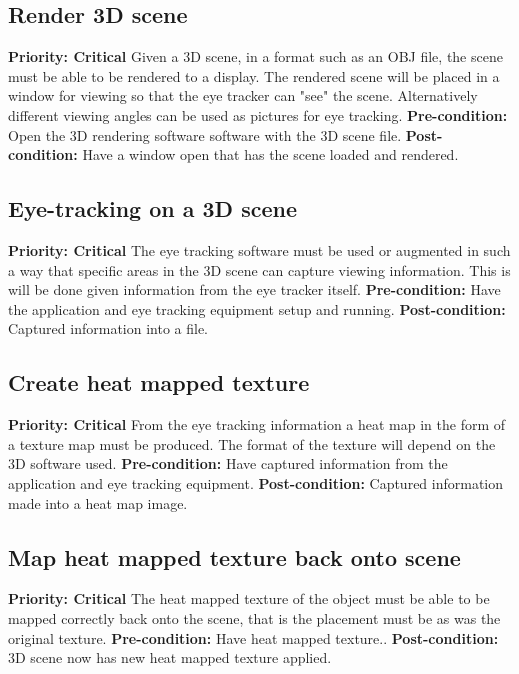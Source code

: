 
\subsection{Render 3D scene}
    \textbf{Priority: Critical}\newline
    Given a 3D scene, in a format such as an OBJ file, the scene must be able to be rendered to a display. The rendered scene will be placed in a window for viewing so that the eye tracker can "see" the scene. Alternatively different viewing angles can be used as pictures for eye tracking.\newline
    \textbf{Pre-condition: }
    Open the 3D rendering software software with the 3D scene file.\newline
    \textbf{Post-condition: }
    Have a window open that has the scene loaded and rendered.
    
\subsection{Eye-tracking on a 3D scene}
    \textbf{Priority: Critical}\newline
    The eye tracking software must be used or augmented in such a way that specific areas in the 3D scene can capture viewing information. This is will be done given information from the eye tracker itself.\newline
    \textbf{Pre-condition: }
    Have the application and eye tracking equipment setup and running.\newline
    \textbf{Post-condition: }
    Captured information into a file.
    
\subsection{Create heat mapped texture}
    \textbf{Priority: Critical}\newline
    From the eye tracking information a heat map in the form of a texture map must be produced. The format of the texture will depend on the 3D software used.\newline
    \textbf{Pre-condition: }
    Have captured information from the application and eye tracking equipment.\newline
    \textbf{Post-condition: }
    Captured information made into a heat map image.
    
\subsection{Map heat mapped texture back onto scene}
    \textbf{Priority: Critical}\newline
    The heat mapped texture of the object must be able to be mapped correctly back onto the scene, that is the placement must be as was the original texture.\newline
    \textbf{Pre-condition: }
    Have heat mapped texture..\newline
    \textbf{Post-condition: }
    3D scene now has new heat mapped texture applied.
    
